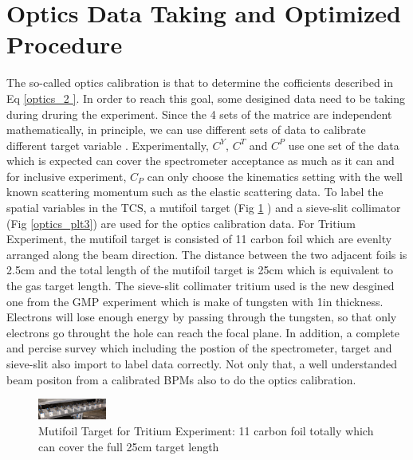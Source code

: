 \section{Optics Data Taking and Optimized Procedure }
The so-called optics calibration is that to determine the cofficients described in Eq \ref{optics_2 }. In order to reach this goal, some desigined data need to be taking during druring the experiment. Since the 4 sets of the matrice are independent mathematically, in principle, we can use different sets of data to calibrate different target variable . Experimentally, $C^{Y}$, $C^{T}$ and $C^{P}$ use one set of the data which is expected can cover the spectrometer acceptance as much as it can and for inclusive experiment, $C_{P}$ can only choose the kinematics setting with the well known scattering momentum such as the elastic scattering data. To label the spatial variables in the TCS, a mutifoil target (Fig \ref{optics_plt2} ) and a sieve-slit collimator (Fig \ref{optics_plt3})  are used for the optics calibration data. For Tritium Experiment, the mutifoil target is consisted of 11 carbon foil which are evenlty arranged along the beam direction. The distance between the two adjacent foils is 2.5cm and the total length of the mutifoil target is 25cm which is equivalent to the gas target length. The sieve-slit collimater tritium used is the new desgined one from the GMP experiment which is make of tungsten with 1in thickness. Electrons will lose enough energy   by passing through the tungsten, so that only electrons go throught the hole can reach the focal plane.  In addition, a complete and percise survey which including the postion of the spectrometer, target and sieve-slit also import to label data correctly. Not only that, a well understanded beam positon from a calibrated BPMs also to do the optics calibration.

\begin{figure}
 	\begin{center}
 		\includegraphics[width=0.2\textwidth] {./optics_plot/optics_3.png}
 		\caption{Mutifoil Target for Tritium Experiment: 11 carbon foil totally which can cover the full 25cm target length} \label{optics_plt2}
 	\end{center}
\end{figure}   

